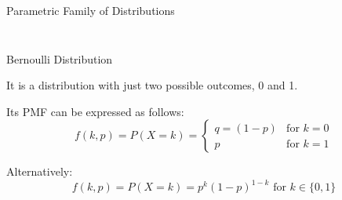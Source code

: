 \begin{frame}{Parametric Family of Distributions}
\begin{columns}
\begin{column}{0.5\textwidth}
\begin{figure}
         \end{figure}
    \end{column}
    \end{columns}

\end{frame}

\begin{frame}{Bernoulli Distribution}

    It is a distribution with just two possible outcomes, 0 and 1.
    
    Its PMF can be expressed as follows:
    \begin{equation}
    f(k, p) = P(X = k) =
    \begin{cases}
    q = (1 - p) & \text{for } k = 0\\
    p           & \text{for } k = 1
    \end{cases}
    \end{equation}
    
    Alternatively:
    \begin{equation}
    f(k, p) = P(X = k) = p^k (1-p)^{1-k} \text{ for } k \in \{0, 1\}
    \end{equation}

    

\end{frame}

